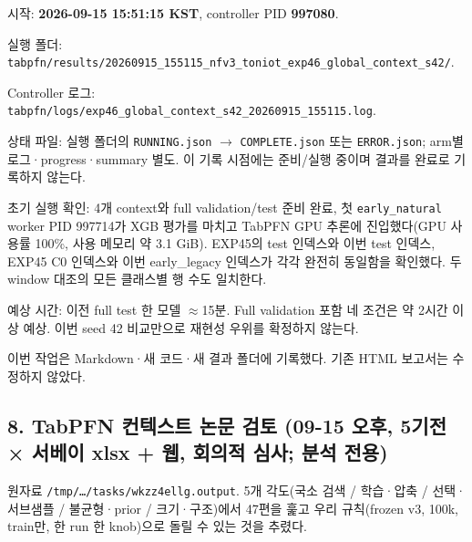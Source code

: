 \par\noindent \textbullet\enspace 시작: \textbf{2026-09-15 15:51:15 KST}, controller PID \textbf{997080}.


\par\noindent \textbullet\enspace 실행 폴더: \texttt{tabpfn/\allowbreak{}\allowbreak{}r\allowbreak{}esults/\allowbreak{}\allowbreak{}2\allowbreak{}0260915\_\allowbreak{}\allowbreak{}155115\_\allowbreak{}\allowbreak{}n\allowbreak{}fv3\_\allowbreak{}\allowbreak{}toni\allowbreak{}ot\_\allowbreak{}\allowbreak{}exp46\allowbreak{}\_\allowbreak{}\allowbreak{}global\_\allowbreak{}\allowbreak{}context\_\allowbreak{}\allowbreak{}s42/\allowbreak{}\allowbreak{}}.


\par\noindent \textbullet\enspace Controller 로그: \texttt{tabpfn/\allowbreak{}\allowbreak{}l\allowbreak{}ogs/\allowbreak{}\allowbreak{}exp4\allowbreak{}6\_\allowbreak{}\allowbreak{}global\allowbreak{}\_\allowbreak{}\allowbreak{}context\allowbreak{}\_\allowbreak{}\allowbreak{}s42\_\allowbreak{}\allowbreak{}202\allowbreak{}60915\_\allowbreak{}\allowbreak{}15\allowbreak{}5115.\allowbreak{}log\allowbreak{}}.


\par\noindent \textbullet\enspace 상태 파일: 실행 폴더의 \texttt{RUNNING.\allowbreak{}json}  \ensuremath{\rightarrow}  \texttt{COMPLETE\allowbreak{}.\allowbreak{}json} 또는 \texttt{ERROR.\allowbreak{}js\allowbreak{}on}; arm별 로그·progress·summary 별도. 이 기록 시점에는 준비/\allowbreak{}실행 중이며 결과를 완료로 기록하지 않는다.


\par\noindent \textbullet\enspace 초기 실행 확인: 4개 context와 full validation/\allowbreak{}test 준비 완료, 첫 \texttt{early\_\allowbreak{}\allowbreak{}na\allowbreak{}tural} worker PID 997714가 XGB 평가를 마치고 TabPFN GPU 추론에 진입했다(GPU 사용률 100\%, 사용 메모리 약 3.1 GiB). EXP45의 test 인덱스와 이번 test 인덱스, EXP45 C0 인덱스와 이번 early\_\allowbreak{}legacy 인덱스가 각각 완전히 동일함을 확인했다. 두 window 대조의 모든 클래스별 행 수도 일치한다.


\par\noindent \textbullet\enspace 예상 시간: 이전 full test 한 모델 \ensuremath{\approx}15분. Full validation 포함 네 조건은 약 2시간 이상 예상. 이번 seed 42 비교만으로 재현성 우위를 확정하지 않는다.


이번 작업은 Markdown·새 코드·새 결과 폴더에 기록했다. 기존 HTML 보고서는 수정하지 않았다.

\subsection{8. TabPFN 컨텍스트 논문 검토 (09-15 오후, 5기전 × 서베이 xlsx +\allowbreak{} 웹, 회의적 심사; 분석 전용)}
원자료 \texttt{/\allowbreak{}\allowbreak{}tmp/\allowbreak{}\allowbreak{}…/\allowbreak{}\allowbreak{}t\allowbreak{}asks/\allowbreak{}\allowbreak{}wkz\allowbreak{}z4ellg.\allowbreak{}o\allowbreak{}utput}. 5개 각도(국소 검색 /\allowbreak{} 학습·압축 /\allowbreak{} 선택·서브샘플 /\allowbreak{} 불균형·prior /\allowbreak{} 크기·구조)에서 47편을 훑고 우리 규칙(frozen v3, 100k, train만, 한 run 한 knob)으로 돌릴 수 있는 것을 추렸다.

